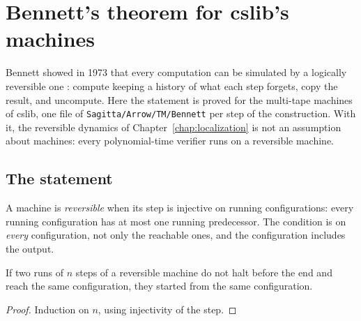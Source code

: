 \chapter{Bennett's theorem for cslib's machines}
\label{chap:bennett}

Bennett showed in 1973 that every computation can be simulated by a logically reversible one
\cite{Bennett73}: compute keeping a history of what each step forgets, copy the result, and
uncompute. Here the statement is proved for the multi-tape machines of cslib, one file of
\texttt{Sagitta/Arrow/TM/Bennett} per step of the construction. With it, the reversible
dynamics of Chapter~\ref{chap:localization} is not an assumption about machines: every
polynomial-time verifier runs on a reversible machine.

\section{The statement}

\begin{definition}
  \label{def:isReversible}
  \leanok
  A machine is \emph{reversible} when its step is injective on running configurations: every
  running configuration has at most one running predecessor. The condition is on \emph{every}
  configuration, not only the reachable ones, and the configuration includes the output.
\end{definition}

\begin{lemma}
  \label{lem:runFrom-injective}
  \leanok
  If two runs of $n$ steps of a reversible machine do not halt before the end and reach the same
  configuration, they started from the same configuration.
\end{lemma}

\begin{proof}
  \leanok
  Induction on $n$, using injectivity of the step.
\end{proof}

